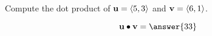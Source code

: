 \documentclass{ximera}
\author{Gregory Hartman \and Matthew Carr}
\begin{document}
\begin{exercise}




Compute the dot product of $\mathbf{u}=\left\langle 5,3\right\rangle$ and $\mathbf{v}=\left\langle 6,1\right\rangle$.

\begin{prompt}
\[
\vec{u}\dotp\vec{v}=\answer{33}
\]
\end{prompt}

\end{exercise}
\end{document}
